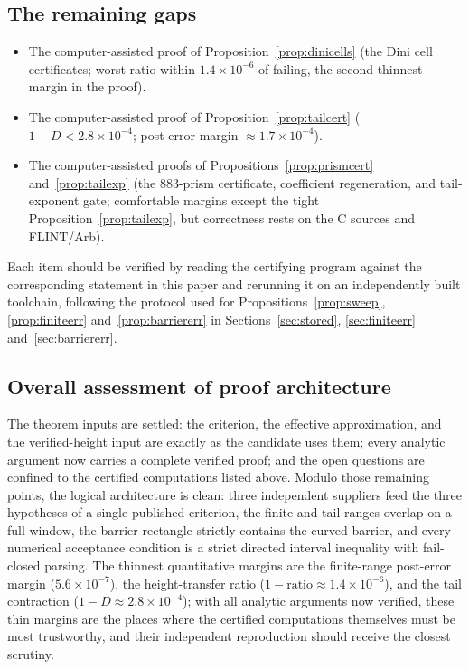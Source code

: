 \documentclass[11pt]{article}
\theoremstyle{definition}
\begin{document}
\subsection*{The remaining gaps}
\begin{itemize}
\item[\textbf{\ref{gap:dinicells}.}] The computer-assisted proof
of Proposition~\ref{prop:dinicells} (the Dini cell certificates;
worst ratio within $1.4\times10^{-6}$ of failing, the
second-thinnest margin in the proof).
\item[\textbf{\ref{gap:tailcomp}.}] The computer-assisted proof of
Proposition~\ref{prop:tailcert} ($1-D<2.8\times10^{-4}$; post-error
margin $\approx1.7\times10^{-4}$).
\item[\textbf{\ref{gap:barriercomp}.}] The computer-assisted
proofs of Propositions~\ref{prop:prismcert}
and~\ref{prop:tailexp} (the $883$-prism certificate, coefficient
regeneration, and tail-exponent gate; comfortable margins except
the tight Proposition~\ref{prop:tailexp}, but correctness rests on
the C sources and FLINT/Arb).
\end{itemize}
Each item should be verified by reading the certifying program
against the corresponding statement in this paper and rerunning it
on an independently built toolchain, following the protocol used
for Propositions~\ref{prop:sweep}, \ref{prop:finiteerr}
and~\ref{prop:barriererr} in Sections~\ref{sec:stored},
\ref{sec:finiteerr} and~\ref{sec:barriererr}.

\subsection*{Overall assessment of proof architecture}
The theorem inputs are settled: the criterion, the effective
approximation, and the verified-height input are exactly as the
candidate uses them; every analytic argument now carries a complete
verified proof; and the open questions are confined to the certified
computations listed above. Modulo those remaining points, the logical
architecture is clean: three independent suppliers feed the three
hypotheses of a single published criterion, the finite and tail
ranges overlap on a full window, the barrier rectangle strictly
contains the curved barrier, and every numerical acceptance
condition is a strict directed interval inequality with fail-closed
parsing. The thinnest quantitative margins are the finite-range
post-error margin ($5.6\times10^{-7}$), the height-transfer ratio
($1-\text{ratio}\approx1.4\times10^{-6}$), and the tail contraction
($1-D\approx2.8\times10^{-4}$); with all analytic arguments now
verified, these thin margins are the places where the certified
computations themselves must be most trustworthy, and their
independent reproduction should receive the closest scrutiny.
\end{document}
